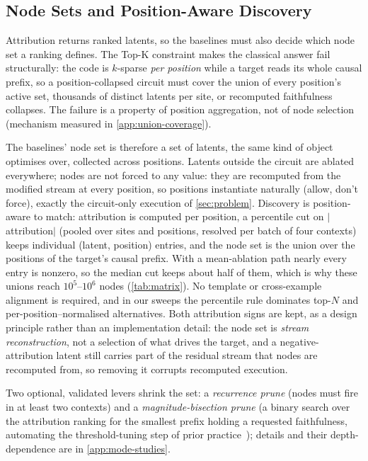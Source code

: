\documentclass[10pt]{article}
\begin{document}
\subsection{Node Sets and Position-Aware Discovery}
\label{sec:membership}

Attribution returns ranked latents, so the baselines must also decide which node set a ranking defines.
The Top-K constraint makes the classical answer fail structurally: the code is $k$-sparse \emph{per position} while a target reads its whole causal prefix, so a position-collapsed circuit must cover the union of every position's active set, thousands of distinct latents per site, or recomputed faithfulness collapses.
The failure is a property of position aggregation, not of node selection (mechanism measured in \cref{app:union-coverage}).

The baselines' node set is therefore a set of latents, the same kind of object  optimises over, collected across positions.
Latents outside the circuit are ablated everywhere; nodes are not forced to any value: they are recomputed from the modified stream at every position, so positions instantiate naturally (allow, don't force), exactly the circuit-only execution of \cref{sec:problem}.
Discovery is position-aware to match: attribution is computed per position, a percentile cut on $|$attribution$|$ (pooled over sites and positions, resolved per batch of four contexts) keeps individual (latent, position) entries, and the node set is the union over the positions of the target's causal prefix.
With a mean-ablation path nearly every entry is nonzero, so the median cut keeps about half of them, which is why these unions reach $10^{5}$--$10^{6}$ nodes (\cref{tab:matrix}).
No template or cross-example alignment is required, and in our sweeps the percentile rule dominates top-$N$ and per-position--normalised alternatives.
Both attribution signs are kept, as a design principle rather than an implementation detail: the node set is \emph{stream reconstruction}, not a selection of what drives the target, and a negative-attribution latent still carries part of the residual stream that nodes are recomputed from, so removing it corrupts recomputed execution.

Two optional, validated levers shrink the set: a \emph{recurrence prune} (nodes must fire in at least two contexts) and a \emph{magnitude-bisection prune} (a binary search over the attribution ranking for the smallest prefix holding a requested faithfulness, automating the threshold-tuning step of prior practice~\citealp{marks2025sparse}); details and their depth-dependence are in \cref{app:mode-studies}.
\end{document}
